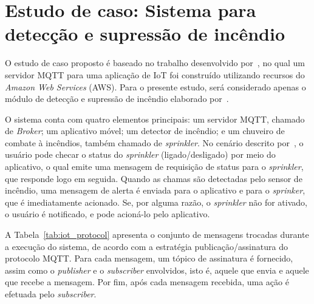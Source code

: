 \chapter{Estudo de caso: Sistema para detecção e supressão de incêndio}

O estudo de caso proposto é baseado no trabalho desenvolvido por~\citeauthor{kang2017room}, no qual um servidor MQTT para uma aplicação de IoT foi construído utilizando recursos do \textit{Amazon Web Services} (AWS). Para o presente estudo, será considerado apenas o módulo de detecção e supressão de incêndio elaborado por~\citeauthor{kang2017room}.

O sistema conta com quatro elementos principais: um servidor MQTT, chamado de \textit{Broker}; um aplicativo móvel; um detector de incêndio; e um chuveiro de combate à incêndios, também chamado de \textit{sprinkler}. No cenário descrito por~\citeauthor{kang2017room}, o usuário pode checar o status do \textit{sprinkler} (ligado/desligado) por meio do aplicativo, o qual emite uma mensagem de requisição de status para o \textit{sprinkler}, que responde logo em seguida. Quando as chamas são detectadas pelo sensor de incêndio, uma mensagem de alerta é enviada para o aplicativo e para o \textit{sprinker}, que é imediatamente acionado. Se, por alguma razão, o \textit{sprinkler} não for ativado, o usuário é notificado, e pode acioná-lo pelo aplicativo.

A Tabela~\ref{tab:iot_protocol} apresenta o conjunto de mensagens trocadas durante a execução do sistema, de acordo com a estratégia publicação/assinatura do protocolo MQTT. Para cada mensagem, um tópico de assinatura é fornecido, assim como o \textit{publisher} e o \textit{subscriber} envolvidos, isto é, aquele que envia e aquele que recebe a mensagem. Por fim, após cada mensagem recebida, uma ação é efetuada pelo \textit{subscriber}.

